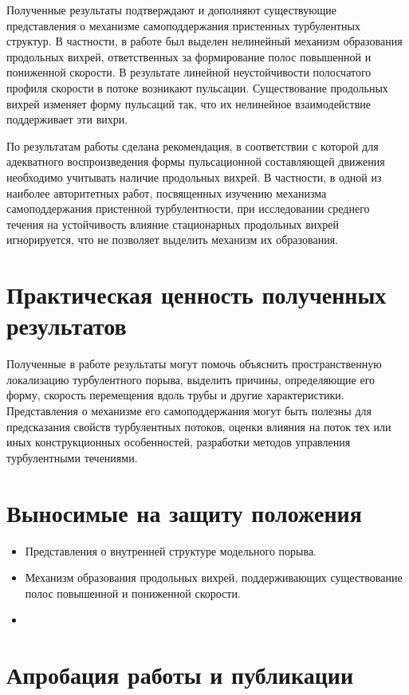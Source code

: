 Полученные результаты подтверждают и дополняют существующие представления о механизме самоподдержания пристенных турбулентных структур. В частности, в работе был выделен нелинейный механизм образования продольных вихрей, ответственных за формирование полос повышенной и пониженной скорости. В результате линейной неустойчивости полосчатого профиля скорости в потоке возникают пульсации. Существование продольных вихрей изменяет форму пульсаций так, что их нелинейное взаимодействие поддерживает эти вихри. 

По результатам работы сделана рекомендация, в соответствии с которой для адекватного воспроизведения формы пульсационной составляющей движения необходимо учитывать наличие продольных вихрей. В частности, в одной из наиболее авторитетных работ, посвященных изучению механизма самоподдержания пристенной турбулентности, \cite{Schoppa2002} при исследовании среднего течения на устойчивость влияние стационарных продольных вихрей игнорируется, что не позволяет выделить механизм их образования. 


\section{Практическая ценность полученных результатов}

Полученные в работе результаты могут помочь объяснить пространственную локализацию турбулентного порыва, выделить причины, определяющие его форму, скорость перемещения вдоль трубы и другие характеристики. Представления о механизме его самоподдержания могут быть полезны для предсказания свойств турбулентных потоков, оценки влияния на поток тех или иных конструкционных особенностей, разработки методов управления турбулентными течениями. 


\section{Выносимые на защиту положения}

\begin{itemize}
\item Представления о внутренней структуре модельного порыва. 
\item Механизм образования продольных вихрей, поддерживающих существование полос повышенной и пониженной скорости. 
\item 
\end{itemize}

\section{Апробация работы и публикации}

